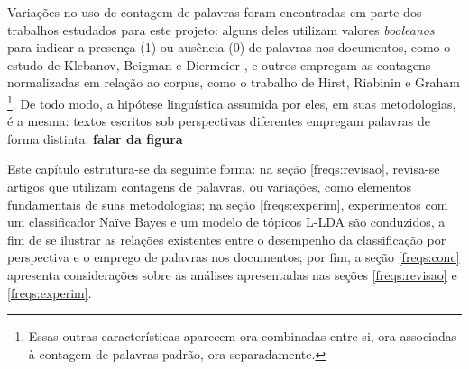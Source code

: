 Variações no uso de contagem de palavras foram encontradas em parte dos trabalhos estudados para este projeto: alguns deles utilizam valores \emph{booleanos} para indicar a presença (1) ou ausência (0) de palavras nos documentos, como o estudo de Klebanov, Beigman e Diermeier \cite{klebanov}, e outros empregam  as contagens normalizadas em relação ao corpus, como o trabalho de Hirst, Riabinin e Graham \cite{hirst-et-al}\footnote{Essas outras características aparecem ora combinadas entre si, ora associadas à contagem de palavras padrão, ora separadamente.}. De todo modo, a hipótese linguística assumida por eles, em suas metodologias, é a mesma: textos escritos sob perspectivas diferentes empregam palavras de forma distinta. \textbf{falar da figura}



Este capítulo estrutura-se da seguinte forma: na seção \ref{freqs:revisao}, revisa-se artigos que utilizam contagens de palavras, ou variações, como elementos fundamentais de suas metodologias; na seção \ref{freqs:experim}, experimentos com um classificador Naïve Bayes e um modelo de tópicos L-LDA são conduzidos, a fim de se ilustrar as relações existentes entre o desempenho da classificação por perspectiva e o emprego de palavras nos documentos; por fim, a seção \ref{freqs:conc} apresenta considerações sobre as análises apresentadas nas seções \ref{freqs:revisao} e \ref{freqs:experim}. 









